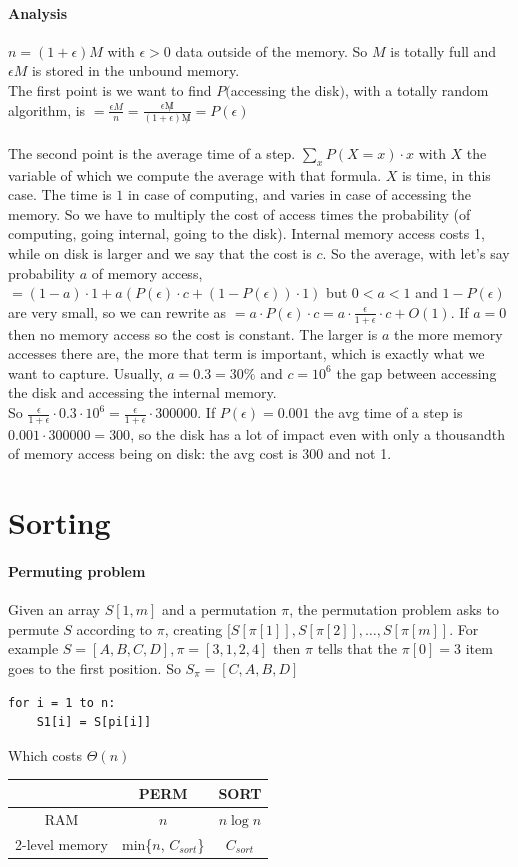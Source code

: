 \documentclass[10pt]{report}
\begin{document}
\paragraph{Analysis}
$n = (1 + \epsilon)M$ with $\epsilon > 0$ data outside of the memory. So $M$ is totally full and $\epsilon M$ is stored in the unbound memory.\\
The first point is we want to find $P($accessing the disk$)$, with a totally random algorithm, is $= \frac{\epsilon M}{n} = \frac{\epsilon\not M}{(1 + \epsilon)\not M} = P(\epsilon)$\\\\
The second point is the average time of a step. $\sum_x P(X = x)\cdot x$ with $X$ the variable of which we compute the average with that formula. $X$ is time, in this case. The time is $1$ in case of computing, and varies in case of accessing the memory. So we have to multiply the cost of access times the probability (of computing, going internal, going to the disk). Internal memory access costs 1, while on disk is larger and we say that the cost is $c$. So the average, with let's say probability $a$ of memory access, $= (1 - a)\cdot 1 + a(P(\epsilon)\cdot c + (1 - P(\epsilon))\cdot 1)$ but $0 < a < 1$ and $1 - P(\epsilon)$ are very small, so we can rewrite as $= a\cdot P(\epsilon)\cdot c = a \cdot \frac{\epsilon}{1 + \epsilon} \cdot c + O(1)$. If $a = 0$ then no memory access so the cost is constant. The larger is $a$ the more memory accesses there are, the more that term is important, which is exactly what we want to capture. Usually, $a = 0.3 = 30\%$ and $c = 10^6$ the gap between accessing the disk and accessing the internal memory.\\
So $\frac{\epsilon}{1 + \epsilon}\cdot 0.3 \cdot 10^6 = \frac{\epsilon}{1 + \epsilon} \cdot 300000$. If $P(\epsilon) = 0.001$ the avg time of a step is $0.001 \cdot 300000 = 300$, so the disk has a lot of impact even with only a thousandth of memory access being on disk: the avg cost is 300 and not 1.
\section{Sorting}
\paragraph{Permuting problem} Given an array $S[1, m]$ and a permutation $\pi$, the permutation problem asks to permute $S$ according to $\pi$, creating $[S[\pi[1]], S[\pi[2]],\ldots,S[\pi[m]]$. For example $S = [A, B, C, D], \pi = [3, 1, 2, 4]$ then $\pi$ tells that the $\pi[0] = 3$ item goes to the first position. So $S_\pi = [C, A, B, D]$
\begin{lstlisting}[style=myPython]
for i = 1 to n:
	S1[i] = S[pi[i]]
\end{lstlisting}
Which costs $\Theta(n)$\\
\begin{tabular}{c | c | c}
 & PERM & SORT \\
\hline
RAM & $n$ & $n\log n$\\
\hline
2-level memory & min\{$n$, $C_{sort}$\} & $C_{sort}$
\end{tabular}
\pagebreak
\end{document}
